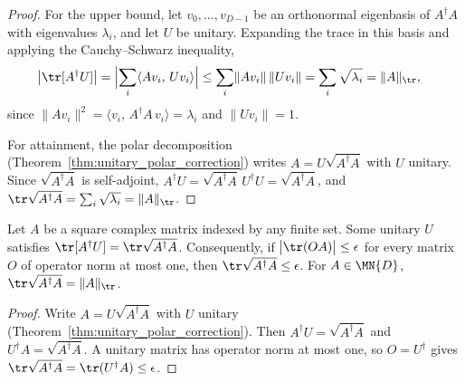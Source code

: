\begin{proof}\leanok
    For the upper bound, let $v_0,\ldots,v_{D-1}$ be an orthonormal
    eigenbasis of $A^\dagger A$ with eigenvalues $\lambda_i$, and let $U$ be
    unitary. Expanding the trace in this basis and applying the
    Cauchy--Schwarz inequality,
    \begin{align}
        \bigl|\tr[A^\dagger U]\bigr|
         & =\Bigl|\sum_i\langle Av_i,\,Uv_i\rangle\Bigr|
        \leq\sum_i\lVert Av_i\rVert\,\lVert Uv_i\rVert
        =\sum_i\sqrt{\lambda_i}
        =\lVert A\rVert_{\tr},
        \notag
    \end{align}
    since $\lVert Av_i\rVert^2=\langle v_i,\,A^\dagger A\,v_i\rangle
        =\lambda_i$ and $\lVert Uv_i\rVert=1$.

    For attainment, the polar decomposition
    (Theorem~\ref{thm:unitary_polar_correction}) writes
    $A=U\sqrt{A^\dagger A}$ with $U$ unitary. Since $\sqrt{A^\dagger A}$ is
    self-adjoint, $A^\dagger U=\sqrt{A^\dagger A}\,U^\dagger U
        =\sqrt{A^\dagger A}$, and
    $\tr\sqrt{A^\dagger A}=\sum_i\sqrt{\lambda_i}=\lVert A\rVert_{\tr}$.
\end{proof}

\begin{theorem}
    \label{thm:trace_norm_duality_any_index}
    \leanok
    Let $A$ be a square complex matrix indexed by any finite set. Some unitary
    $U$ satisfies $\tr[A^\dagger U]=\tr\sqrt{A^\dagger A}$. Consequently, if
    $\bigl|\tr(OA)\bigr|\leq\epsilon$ for every matrix $O$ of operator
    norm at most one, then $\tr\sqrt{A^\dagger A}\leq\epsilon$. For
    $A\in\MN{D}$, $\tr\sqrt{A^\dagger A}=\lVert A\rVert_{\tr}$.
\end{theorem}

\begin{proof}\leanok
    Write $A=U\sqrt{A^\dagger A}$ with $U$ unitary
    (Theorem~\ref{thm:unitary_polar_correction}). Then
    $A^\dagger U=\sqrt{A^\dagger A}$ and $U^\dagger A=\sqrt{A^\dagger A}$.
    A unitary matrix has operator norm at most one, so $O=U^\dagger$ gives
    $\tr\sqrt{A^\dagger A}=\tr(U^\dagger A)\leq\epsilon$.
\end{proof}


